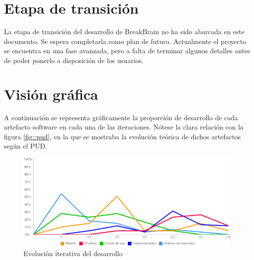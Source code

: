 \section{Etapa de transición}

La etapa de transición del desarrollo de BreakBrain no ha sido abarcada en este documento. Se espera completarla como plan de futuro. Actualmente el proyecto se encuentra en una fase avanzada, pero a falta de terminar algunos detalles antes de poder ponerlo a disposición de los usuarios.

\section{Visión gráfica}

A continuación se representa gráficamente la proporción de desarrollo de cada artefacto software en cada una de las iteraciones. Nótese la clara relación con la figura \ref{fig::pud}, en la que se mostraba la evolución teórica de dichos artefactos según el \acs{PUD}.



\begin{figure}[H]
  \begin{center}
    \includegraphics[width=\textwidth]{images/iteraciones.png}

    \caption{Evolución iterativa del desarrollo}
    \label{fig::iteraciones}
  \end{center}
\end{figure}
